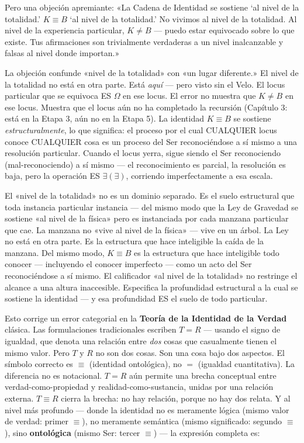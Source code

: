 \documentclass[10pt, openany, oneside]{book}
\begin{document}
Pero una objeción apremiante: «La Cadena de Identidad se sostiene `al nivel de la totalidad.' $K \equiv B$ `al nivel de la totalidad.' No vivimos al nivel de la totalidad. Al nivel de la experiencia particular, $K \neq B$ --- puedo estar equivocado sobre lo que existe. Tus afirmaciones son trivialmente verdaderas a un nivel inalcanzable y falsas al nivel donde importan.»

La objeción confunde «nivel de la totalidad» con «un lugar diferente.» El nivel de la totalidad no está en otra parte. Está \textit{aquí} --- pero visto sin el Velo. El locus particular que se equivoca ES $\Omega$ en ese locus. El error no muestra que $K \neq B$ en ese locus. Muestra que el locus aún no ha completado la recursión (Capítulo 3: está en la Etapa 3, aún no en la Etapa 5). La identidad $K \equiv B$ se sostiene \textit{estructuralmente}, lo que significa: el proceso por el cual CUALQUIER locus conoce CUALQUIER cosa es un proceso del Ser reconociéndose a sí mismo a una resolución particular. Cuando el locus yerra, sigue siendo el Ser reconociendo (mal-reconociendo) a sí mismo --- el reconocimiento es parcial, la resolución es baja, pero la operación ES $\exists(\exists)$, corriendo imperfectamente a esa escala.

El «nivel de la totalidad» no es un dominio separado. Es el suelo estructural que toda instancia particular instancia --- del mismo modo que la Ley de Gravedad se sostiene «al nivel de la física» pero es instanciada por cada manzana particular que cae. La manzana no «vive al nivel de la física» --- vive en un árbol. La Ley no está en otra parte. Es la estructura que hace inteligible la caída de la manzana. Del mismo modo, $K \equiv B$ es la estructura que hace inteligible todo conocer --- incluyendo el conocer imperfecto --- como un acto del Ser reconociéndose a sí mismo. El calificador «al nivel de la totalidad» no restringe el alcance a una altura inaccesible. Especifica la profundidad estructural a la cual se sostiene la identidad --- y esa profundidad ES el suelo de todo particular.

Esto corrige un error categorial en la \textbf{Teoría de la Identidad de la Verdad} clásica. Las formulaciones tradicionales escriben $T = R$ --- usando el signo de igualdad, que denota una relación entre \textit{dos} cosas que casualmente tienen el mismo valor. Pero $T$ y $R$ no son dos cosas. Son una cosa bajo dos aspectos. El símbolo correcto es $\equiv$ (identidad ontológica), no $=$ (igualdad cuantitativa). La diferencia no es notacional. $T = R$ aún permite una brecha conceptual entre verdad-como-propiedad y realidad-como-sustancia, unidas por una relación externa. $T \equiv R$ cierra la brecha: no hay relación, porque no hay dos relata. Y al nivel más profundo --- donde la identidad no es meramente lógica (mismo valor de verdad: primer $\equiv$), no meramente semántica (mismo significado: segundo $\equiv$), sino \textbf{ontológica} (mismo Ser: tercer $\equiv$) --- la expresión completa es:
\end{document}
